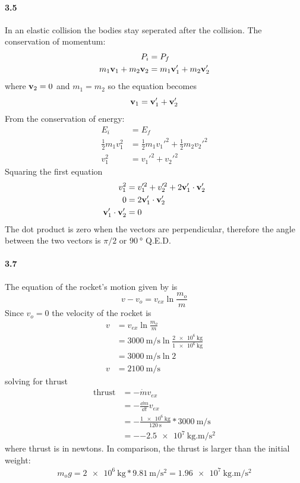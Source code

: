 \documentclass[../problems.tex]{subfiles}
\begin{document}
\newpage
\paragraph{3.5}

In an elastic collision the bodies stay seperated after the collision. The conservation of momentum:
\begin{align*}
    P_i &= P_f \\
    m_1 \vb{v}_1 + m_2\vb{v}_2 &= m_1\vb{v}_1' + m_2\vb{v}_2'
\end{align*}
where $\vb{v}_2 = 0$ and $m_1 = m_2$ so the equation becomes
\begin{equation*}
    \vb{v}_1 = \vb{v}_1' + \vb{v}_2'
\end{equation*}
From the conservation of energy:
\begin{align*}
    E_i &= E_f \\
    \frac{1}{2}m_1v_1^2 &= \frac{1}{2}m_1v_1'^2 + \frac{1}{2}m_2v_2'^2 \\
    v_1^2 &= v_1'^2 + v_2'^2
\end{align*}
Squaring the first equation
\begin{align*}
    v_1^2 &= v_1'^2 + v_2'^2 + 2\vb{v}_1' \cdot \vb{v}_2' \\
    0 &= 2\vb{v}_1' \cdot \vb{v}_2' \\
    \vb{v}_1' \cdot \vb{v}_2' &= 0
\end{align*}
The dot product is zero when the vectors are perpendicular, therefore the angle between the two
vectors is $\pi/2$ or $\qty{90}{\degree}$ Q.E.D.

\paragraph{3.7}

The equation of the rocket's motion given by is
\begin{equation*} \tag{3.8}
    v - v_o = v_{ex} \ln{\frac{m_o}{m}}
\end{equation*}
Since $v_o = 0$ the velocity of the rocket is
\begin{align*}
    v &= v_{ex} \ln{\frac{m_o}{m}} \\
    &= \qty{3000}{\meter/\second} \ln{\frac{\qty{2e6}{\kilo\gram}}{\qty{1e6}{\kilo\gram}}} \\
    &= \qty{3000}{\meter/\second} \ln{2} \\
    v &= \qty{2100}{\meter/\second}
\end{align*}
solving for thrust
\begin{align*}
    \textrm{thrust} &= -\dot{m} v_{ex} \\
    &= - \frac{\dd{m}}{\dd{t}} v_{ex} \\
    &= -\frac{\qty{1e6}{\kilo\gram}}{\qty{120}{\s}} * \qty{3000}{\meter/\second} \\
    &= -\qty{-2.5e7}{\kilo\gram.\m/\second^2}
\end{align*}
where thrust is in newtons. In comparison, the thrust is larger than the initial weight:
\begin{align*}
    m_og= \qty{2e6}{\kilo\gram}*\qty{9.81}{\meter/\second^2} = \qty{1.96e7}{\kilo\gram.\m/\second^2}
\end{align*}
\end{document}

